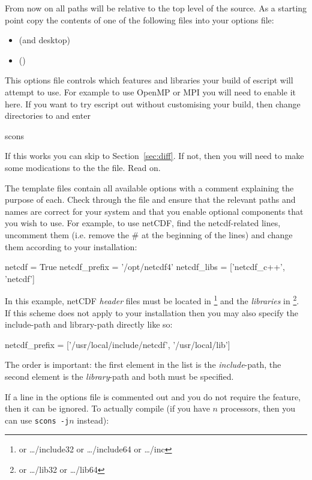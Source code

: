 From now on all paths will be relative to the top level of the source.
As a starting point copy the contents of one of the following files into your options file:
\begin{itemize}
\item {} (\linux and \macosx desktop)
\item {} (\winxp)
\end{itemize}

This options file controls which features and libraries your build of escript will attempt to use.
For example to use OpenMP or MPI you will need to enable it here.
If you want to try escript out without customising your build, then change
directories to  and enter
\begin{shellCode}
scons 
\end{shellCode}
If this works you can skip to Section~\ref{sec:diff}.
If not, then you will need to make some modications to the the file.
Read on.

The template files contain all available options with a comment explaining the
purpose of each.
Check through the file and ensure that the relevant paths and names are correct
for your system and that you enable optional components that you wish to use.
For example, to use netCDF, find the netcdf-related lines, uncomment them
(i.e. remove the \# at the beginning of the lines) and change them according
to your installation:
\begin{shellCode}
netcdf = True
netcdf_prefix = '/opt/netcdf4'
netcdf_libs = ['netcdf_c++', 'netcdf']
\end{shellCode}

In this example, netCDF \emph{header} files must be located in
\footnote{or \ldots/include32 or \ldots/include64 or \ldots/inc}
and the \emph{libraries} in \footnote{or \ldots/lib32 or \ldots/lib64}.
If this scheme does not apply to your installation then you may also specify
the include-path and library-path directly like so:
\begin{shellCode}
netcdf_prefix = ['/usr/local/include/netcdf', '/usr/local/lib']
\end{shellCode}
The order is important: the first element in the list is the
\emph{include}-path, the second element is the \emph{library}-path and both
must be specified.

If a line in the options file is commented out and you do not require the
feature, then it can be ignored.
To actually compile (if you have $n$ processors, then you can use \texttt{scons -j$n$} instead):

